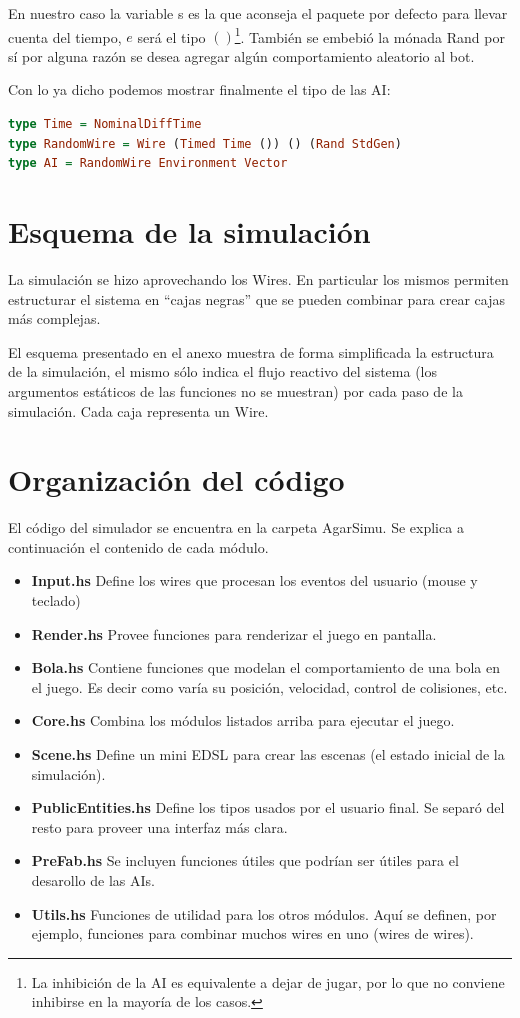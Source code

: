 \documentclass[12pt]{article}
\begin{document}
En nuestro caso la variable s es la que aconseja el paquete por defecto para llevar cuenta del tiempo, $e$ será el tipo $()$\footnote{La inhibición de la AI es equivalente a dejar de jugar, por lo que no conviene inhibirse en la mayoría de los casos.}. También se embebió la mónada Rand por sí por alguna razón se desea agregar algún comportamiento aleatorio al bot.

Con lo ya dicho podemos mostrar finalmente el tipo de las AI:
\begin{lstlisting}[language=haskell]
type Time = NominalDiffTime
type RandomWire = Wire (Timed Time ()) () (Rand StdGen)
type AI = RandomWire Environment Vector
\end{lstlisting}

\section{Esquema de la simulación}
La simulación se hizo aprovechando los Wires. En particular los mismos permiten estructurar el sistema en ``cajas negras'' que se pueden combinar para crear cajas más complejas.

El esquema presentado en el anexo muestra de forma simplificada la estructura de la simulación, el mismo sólo indica el flujo reactivo del sistema (los argumentos estáticos de las funciones no se muestran) por cada paso de la simulación. Cada caja representa un Wire.

\section{Organización del código}
El código del simulador se encuentra en la carpeta AgarSimu. Se explica a continuación el contenido de cada módulo.
\begin{itemize}
\item \textbf{Input.hs} Define los wires que procesan los eventos del usuario (mouse y teclado)
\item \textbf{Render.hs} Provee funciones para renderizar el juego en pantalla.
\item \textbf{Bola.hs} Contiene funciones que modelan el comportamiento de una bola en el juego. Es decir como varía su posición, velocidad, control de colisiones, etc.
\item \textbf{Core.hs} Combina los módulos listados arriba para ejecutar el juego.
\item \textbf{Scene.hs} Define un mini EDSL para crear las escenas (el estado inicial de la simulación).
\item \textbf{PublicEntities.hs} Define los tipos usados por el usuario final. Se separó del resto para proveer una interfaz más clara. 
\item \textbf{PreFab.hs} Se incluyen funciones útiles que podrían ser útiles para el desarollo de las AIs. 
\item \textbf{Utils.hs} Funciones de utilidad para los otros módulos. Aquí se definen, por ejemplo, funciones para combinar muchos wires en uno (wires de wires). 
\end{itemize}
\end{document}

